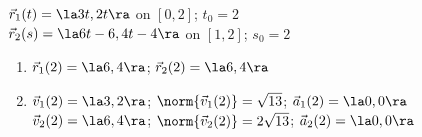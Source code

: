 {$\vec r_1(t) = \la 3t,2t\ra$ on $[0,2]$; $t_0 = 2$\\
$\vec r_2(s) = \la 6t-6,4t-4\ra$ on $[1,2]$; $s_0 = 2$
}
{
\begin{enumerate}
	\item $\vec r_1(2) = \la6,4\ra$; $\vec r_2(2) = \la 6,4\ra$
	\item	$\vec v_1(2) = \la 3,2\ra$; $\norm{\vec v_1(2)} = \sqrt{13}$; $\vec a_1(2) = \la 0,0\ra$\\
			$\vec v_2(2) = \la 6,4\ra$; $\norm{\vec v_2(2)} = 2\sqrt{13}$; $\vec a_2(2) = \la 0,0\ra$
\end{enumerate}
}